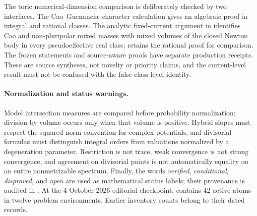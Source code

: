 The toric numerical-dimension comparison is deliberately checked by two
interfaces.  The Cao--Guenancia--character calculation gives an algebraic
proof in integral and rational classes.  The analytic fixed-current argument
in  identifies Cao and non-pluripolar
mixed masses with mixed volumes of the closed Newton body in every
pseudoeffective real class;  retains the
rational proof for comparison.  The frozen statements and source-aware
proofs have separate production receipts.  These are source syntheses, not
novelty or priority claims, and the current-level result must not be confused
with the false class-level identity.

\paragraph{Normalization and status warnings.}
\label{front:part6-normalization-and-status-warnings}
Model intersection measures are compared before probability normalization;
division by volume occurs only when that volume is positive.  Hybrid slopes
must respect the squared-norm convention for complex potentials, and
divisorial formulas must distinguish integral orders from valuations
normalized by a degeneration parameter.  Restriction is not trace, weak
convergence is not strong convergence, and agreement on divisorial points is
not automatically equality on an entire nonmetrizable spectrum.  Finally,
the words \emph{verified}, \emph{conditional}, \emph{disproved}, and
\emph{open} are used as mathematical status labels; their provenance is
audited in . At the 4 October 2026 editorial checkpoint,
 contains 42 active atoms in twelve problem
environments. Earlier inventory counts belong to their dated records.
